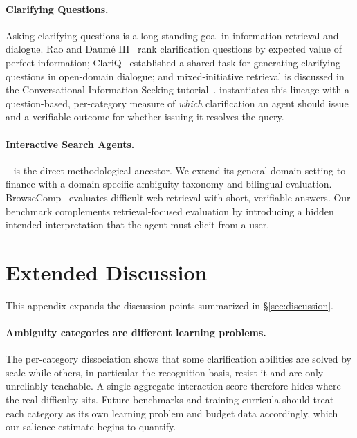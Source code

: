 \paragraph{Clarifying Questions.}
Asking clarifying questions is a long-standing goal in information retrieval and
dialogue. Rao and Daum\'e III~\citep{rao2018clarification} rank clarification
questions by expected value of perfect information; ClariQ~\citep{aliannejadi2020clariq}
established a shared task for generating clarifying questions in open-domain dialogue;
and mixed-initiative retrieval is discussed in the Conversational Information Seeking tutorial~\citep{zamani2023cis}. \fininteract instantiates this lineage with a
question-based, per-category measure of \emph{which} clarification an agent should issue and a
verifiable outcome for whether issuing it resolves the query.

\paragraph{Interactive Search Agents.}
\interactcomp~\citep{interactcomp2026} is the direct methodological ancestor.
We extend its general-domain setting to finance with a domain-specific
ambiguity taxonomy and bilingual evaluation.
BrowseComp~\citep{wei2025browsecomp} evaluates difficult web retrieval with short, verifiable answers. Our benchmark complements retrieval-focused evaluation by introducing a hidden intended interpretation that the agent must elicit from a user.



\section{Extended Discussion}
\label{app:discussion}

This appendix expands the discussion points summarized in \S\ref{sec:discussion}.

\paragraph{Ambiguity categories are different learning problems.} The per-category dissociation shows that some
clarification abilities are solved by scale while others, in particular the recognition basis, resist
it and are only unreliably teachable. A single aggregate interaction score therefore hides
where the real difficulty sits. Future benchmarks and training curricula should treat each
category as its own learning problem and budget data accordingly, which our salience estimate
begins to quantify.

